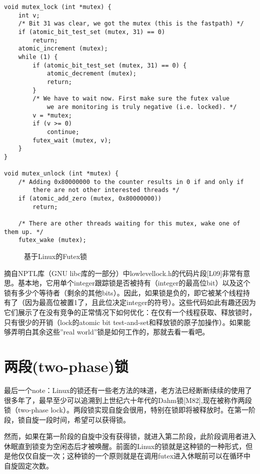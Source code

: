 \begin{lstlisting}
void mutex_lock (int *mutex) {
    int v;
    /* Bit 31 was clear, we got the mutex (this is the fastpath) */
    if (atomic_bit_test_set (mutex, 31) == 0)
        return;
    atomic_increment (mutex);
    while (1) {
        if (atomic_bit_test_set (mutex, 31) == 0) {
            atomic_decrement (mutex);
            return;
        }
        /* We have to wait now. First make sure the futex value
            we are monitoring is truly negative (i.e. locked). */
        v = *mutex;
        if (v >= 0)
            continue;
        futex_wait (mutex, v);
    }
}

void mutex_unlock (int *mutex) {
    /* Adding 0x80000000 to the counter results in 0 if and only if
        there are not other interested threads */
    if (atomic_add_zero (mutex, 0x80000000))
        return;

    /* There are other threads waiting for this mutex, wake one of them up. */
    futex_wake (mutex);
\end{lstlisting}
\begin{figure}[h]
\setlength{\abovecaptionskip}{1pt}
\caption{基于Linux的Futex锁}
\setlength{\belowcaptionskip}{1pt}
\end{figure}

摘自NPTL库（GNU libc库的一部分）中lowlevellock.h的代码片段[L09]非常有意思。基本地，它用单个integer跟踪锁是否被持有（integer的最高位bit）以及这个锁有多少个等待者（剩余的其他bits）。因此，如果锁是负的，即它被某个线程持有了（因为最高位被置1了，且此位决定integer的符号）。这些代码如此有趣还因为它们展示了在没有竞争的正常情况下如何优化：在仅有一个线程获取、释放锁时，只有很少的开销（lock的atomic bit test-and-set和释放锁的原子加操作）。如果能够弄明白其余这些”real world”锁是如何工作的，那就去看一看吧。


\section{两段(two-phase)锁}

最后一个note：Linux的锁还有一些老方法的味道，老方法已经断断续续的使用了很多年了，最早至少可以追溯到上世纪六十年代的Dahm锁[M82],现在被称作两段锁（two-phase lock）。两段锁实现自旋会很用，特别在锁即将被释放时。在第一阶段，锁自旋一段时间，希望可以获得锁。

然而，如果在第一阶段的自旋中没有获得锁，就进入第二阶段，此阶段调用者进入休眠直到锁变为空闲态后才被唤醒。前面的Linux的锁就是这种锁的一种形式，但是他仅仅自旋一次；这种锁的一个原则就是在调用futex进入休眠前可以在循环中自旋固定次数。


